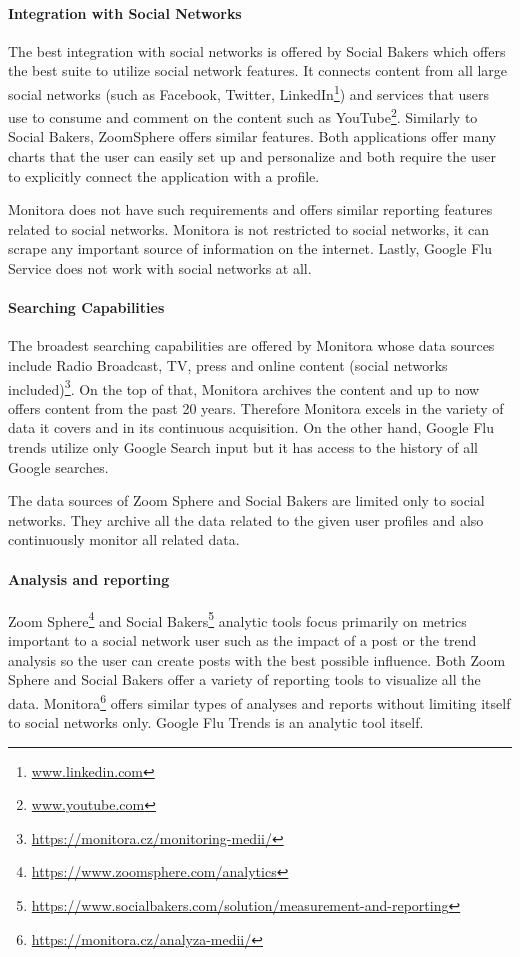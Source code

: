 \paragraph{Integration with Social Networks}

The best integration with social networks is offered by Social Bakers which offers the best suite to utilize social network features. It connects content from all large social networks (such as Facebook, Twitter, LinkedIn\footnote{\url{www.linkedin.com}}) and services that users use to consume and comment on the content such as YouTube\footnote{\url{www.youtube.com}}. Similarly to Social Bakers, ZoomSphere offers similar features. Both applications offer many charts that the user can easily set up and personalize and both require the user to explicitly connect the application with a profile.

Monitora does not have such requirements and offers similar reporting features related to social networks. Monitora is not restricted to social networks, it can scrape any important source of information on the internet. Lastly, Google Flu Service does not work with social networks at all. 

\paragraph{Searching Capabilities}

The broadest searching capabilities are offered by Monitora whose data sources include Radio Broadcast, TV, press and online content (social networks included)\footnote{\url{https://monitora.cz/monitoring-medii/}}. On the top of that, Monitora archives the content and up to now offers content from the past 20 years. Therefore Monitora excels in the variety of data it covers and in its continuous acquisition. On the other hand, Google Flu trends utilize only Google Search input but it has access to the history of all Google searches.

The data sources of Zoom Sphere and Social Bakers are limited only to social networks. They archive all the data related to the given user profiles and also continuously monitor all related data. 

\paragraph{Analysis and reporting}

Zoom Sphere\footnote{\url{https://www.zoomsphere.com/analytics}} and Social Bakers\footnote{\url{https://www.socialbakers.com/solution/measurement-and-reporting}} analytic tools focus primarily on metrics important to a social network user such as the impact of a post or the trend analysis so the user can create posts with the best possible influence. Both Zoom Sphere and Social Bakers offer a variety of reporting tools to visualize all the data. Monitora\footnote{\url{https://monitora.cz/analyza-medii/}} offers similar types of analyses and reports without limiting itself to social networks only. Google Flu Trends is an analytic tool itself.

